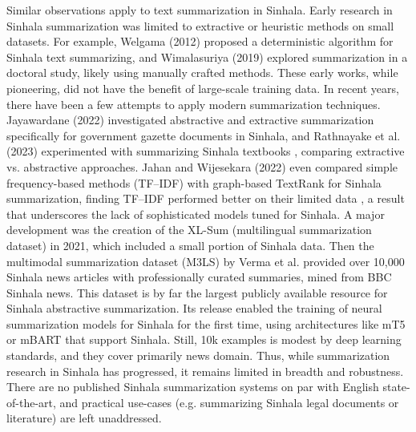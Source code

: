 \documentclass[12pt]{uomthesis}
\begin{document}
Similar observations apply to text summarization in Sinhala. Early research in Sinhala summarization was limited to extractive or heuristic methods on small datasets. For example, Welgama (2012) proposed a deterministic algorithm for Sinhala text summarizing, and Wimalasuriya (2019) explored summarization in a doctoral study, likely using manually crafted methods. These early works, while pioneering, did not have the benefit of large-scale training data. In recent years, there have been a few attempts to apply modern summarization techniques. Jayawardane (2022) investigated abstractive and extractive summarization specifically for government gazette documents in Sinhala, and Rathnayake et al. (2023) experimented with summarizing Sinhala textbooks \cite{9}, comparing extractive vs. abstractive approaches. Jahan and Wijesekara (2022) even compared simple frequency-based methods (TF–IDF) with graph-based TextRank for Sinhala summarization, finding TF–IDF performed better on their limited data \cite{10}, a result that underscores the lack of sophisticated models tuned for Sinhala. A major development was the creation of the XL-Sum (multilingual summarization dataset) \cite{11} in 2021, which included a small portion of Sinhala data. Then the multimodal summarization dataset (M3LS) by Verma et al. \cite{12} provided over 10,000 Sinhala news articles with professionally curated summaries, mined from BBC Sinhala news. This dataset is by far the largest publicly available resource for Sinhala abstractive summarization. Its release enabled the training of neural summarization models for Sinhala for the first time, using architectures like mT5 or mBART that support Sinhala. Still, 10k examples is modest by deep learning standards, and they cover primarily news domain. Thus, while summarization research in Sinhala has progressed, it remains limited in breadth and robustness. There are no published Sinhala summarization systems on par with English state-of-the-art, and practical use-cases (e.g. summarizing Sinhala legal documents or literature) are left unaddressed. 
\end{document}
